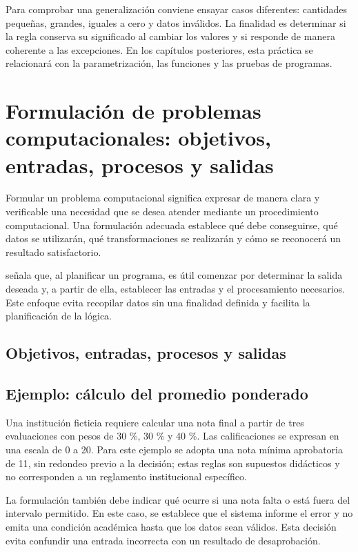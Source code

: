 Para comprobar una generalización conviene ensayar casos diferentes: cantidades pequeñas, grandes, iguales a cero y datos inválidos. La finalidad es determinar si la regla conserva su significado al cambiar los valores y si responde de manera coherente a las excepciones. En los capítulos posteriores, esta práctica se relacionará con la parametrización, las funciones y las pruebas de programas.

\section{Formulación de problemas computacionales: objetivos, entradas, procesos y salidas}

Formular un problema computacional significa expresar de manera clara y verificable una necesidad que se desea atender mediante un procedimiento computacional. Una formulación adecuada establece qué debe conseguirse, qué datos se utilizarán, qué transformaciones se realizarán y cómo se reconocerá un resultado satisfactorio.

\textcite[pp.~8–10]{farrell2013} señala que, al planificar un programa, es útil comenzar por determinar la salida deseada y, a partir de ella, establecer las entradas y el procesamiento necesarios. Este enfoque evita recopilar datos sin una finalidad definida y facilita la planificación de la lógica.

\subsection{Objetivos, entradas, procesos y salidas}



\subsection{Ejemplo: cálculo del promedio ponderado}

Una institución ficticia requiere calcular una nota final a partir de tres evaluaciones con pesos de 30 \%, 30 \% y 40 \%. Las calificaciones se expresan en una escala de 0 a 20. Para este ejemplo se adopta una nota mínima aprobatoria de 11, sin redondeo previo a la decisión; estas reglas son supuestos didácticos y no corresponden a un reglamento institucional específico.



La formulación también debe indicar qué ocurre si una nota falta o está fuera del intervalo permitido. En este caso, se establece que el sistema informe el error y no emita una condición académica hasta que los datos sean válidos. Esta decisión evita confundir una entrada incorrecta con un resultado de desaprobación.

